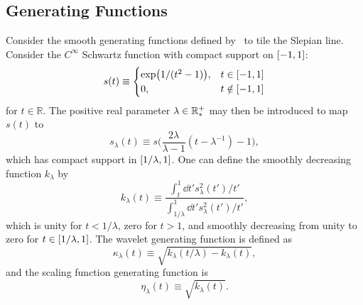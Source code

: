 \subsection{Generating Functions}

Consider the smooth generating functions defined by~\cite{Wiaux2008} to tile the Slepian line.
Consider the \(C^{\infty}\) Schwartz function with compact support on \(\interval{-1}{1}\):
%
\begin{equation}
	s(t) \equiv
	\begin{cases}
		\exp(1/(t^{2}-1)), & t \in \interval{-1}{1}    \\
		0,                 & t \notin \interval{-1}{1}
	\end{cases}
\end{equation}
%
for \(t \in \mathbb{R}\).
The positive real parameter \(\lambda \in \mathbb{R}_{\ast}^{+}{}\) may then be introduced to map \(s(t)\) to
%
\begin{equation}
	s_{\lambda}(t)
	\equiv s\bigg(\frac{2\lambda}{\lambda-1}(t-\lambda^{-1}) - 1\bigg),
\end{equation}
%
which has compact support in \(\interval{1/\lambda}{1}\).
One can define the smoothly decreasing function \(k_{\lambda}\) by
%
\begin{equation}
	k_{\lambda}(t)
	\equiv \frac{\int_{t}^{1} \dd{t'} s^{2}_{\lambda}(t')/t'}
	{\int_{1/\lambda}^{1} \dd{t'} s^{2}_{\lambda}(t')/t'},
\end{equation}
%
which is unity for \(t < 1/\lambda{}\), zero for \(t > 1\), and smoothly decreasing from unity to zero for \(t \in \interval{1/\lambda}{1}\).
The wavelet generating function is defined as
%
\begin{equation}
	\kappa_{\lambda}(t)
	\equiv \sqrt{k_{\lambda}(t/\lambda) - k_{\lambda}(t)},
\end{equation}
%
and the scaling function generating function is
%
\begin{equation}
	\eta_{\lambda}(t)
	\equiv \sqrt{k_{\lambda}(t)}.
\end{equation}

